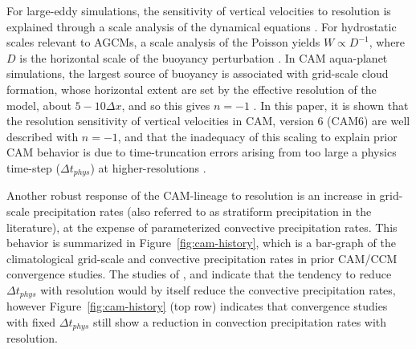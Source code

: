 \documentclass[times]{qjrms4}
\begin{document}
For large-eddy simulations, the sensitivity of vertical velocities to resolution is explained through a scale analysis of the dynamical equations \citep{WETAL1997MWR,PG2006JAS,JR2016QJRMS}. For hydrostatic scales relevant to AGCMs, a scale analysis of the Poisson yields $W \propto D^{-1}$, where $D$ is the horizontal scale of the buoyancy perturbation \citep{HR2018JAMES}. In CAM aqua-planet simulations, the largest source of buoyancy is associated with grid-scale cloud formation, whose horizontal extent are set by the effective resolution of the model, about $5-10 \Delta x$, and so this gives $n=-1$ \citep{HR2018JAMES}. In this paper, it is shown that the resolution sensitivity of vertical velocities in CAM, version 6 (CAM6) are well described with $n=-1$, and that the inadequacy of this scaling to explain prior CAM behavior \citep{HR2017JCLIM} is due to time-truncation errors arising from too large a physics time-step ($\Delta t_{phys}$) at higher-resolutions \citep{HR2018JAMES,HETAL2019JAMES}.

Another robust response of the CAM-lineage to resolution is an increase in grid-scale precipitation rates (also referred to as stratiform precipitation in the literature), at the expense of parameterized convective precipitation rates. This behavior is summarized in Figure~\ref{fig:cam-history}, which is a bar-graph of the climatological grid-scale and convective precipitation rates in prior CAM/CCM convergence studies. The studies of \cite{KW1991JGR}, \cite{WETAL1995CD} and \cite{W2013QJRMS} indicate that the tendency to reduce $\Delta t_{phys}$ with resolution would by itself reduce the convective precipitation rates, however Figure~\ref{fig:cam-history} (top row) indicates that convergence studies with fixed $\Delta t_{phys}$ still show a reduction in convection precipitation rates with resolution.
\end{document}
